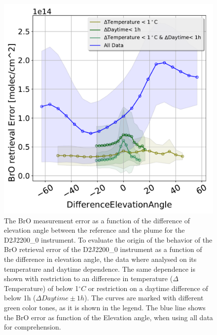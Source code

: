 \begin{figure}
	\centering
	\includegraphics[width=0.7\linewidth]{Bilder/DiffElevAngleKomischesInstr}
	\caption{The BrO measurement error as a function of the difference of elevation angle between the reference and the plume for the D2J2200\_0 instrument. To evaluate the origin of the behavior of the BrO retrieval error of the D2J2200\_0 instrument as a function of the difference in elevation angle, the data where analysed on its temperature and daytime dependence. The same dependence is shown with restriction to an difference in temperature ($\Delta$Temperature) of below 1$^{\circ}C$ or restriction on a daytime difference of below 1h ($\Delta Daytime \pm 1h$). The curves are marked with different green color tones, as it is shown in the legend. The blue line shows the BrO error as function of the Elevation angle, when using all data for comprehension.}
	\label{fig:d2j22000diffelevangleonetempnevad}
\end{figure}


